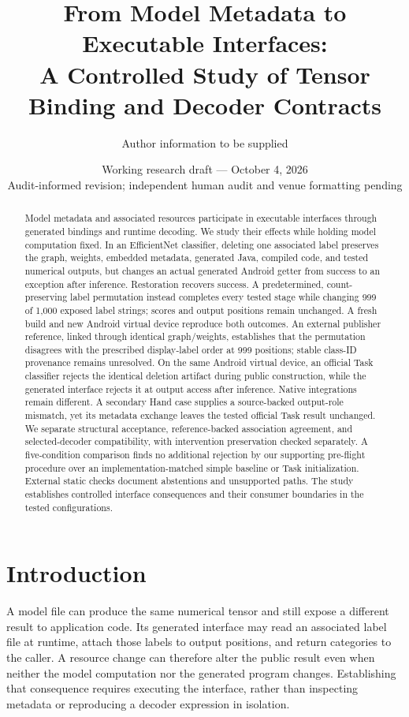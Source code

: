 \documentclass[10pt,twocolumn,letterpaper]{article}
\title{From Model Metadata to Executable Interfaces:\\A Controlled Study of Tensor Binding and Decoder Contracts}
\author{Author information to be supplied}
\date{Working research draft --- October 4, 2026\\\small Audit-informed revision; independent human audit and venue formatting pending}
\begin{document}
\maketitle

\begin{abstract}
Model metadata and associated resources participate in executable interfaces through generated bindings and runtime decoding. We study their effects while holding model computation fixed. In an EfficientNet classifier, deleting one associated label preserves the graph, weights, embedded metadata, generated Java, compiled code, and tested numerical outputs, but changes an actual generated Android getter from success to an exception after inference. Restoration recovers success. A predetermined, count-preserving label permutation instead completes every tested stage while changing 999 of 1,000 exposed label strings; scores and output positions remain unchanged. A fresh build and new Android virtual device reproduce both outcomes. An external publisher reference, linked through identical graph/weights, establishes that the permutation disagrees with the prescribed display-label order at 999 positions; stable class-ID provenance remains unresolved. On the same Android virtual device, an official Task classifier rejects the identical deletion artifact during public construction, while the generated interface rejects it at output access after inference. Native integrations remain different. A secondary Hand case supplies a source-backed output-role mismatch, yet its metadata exchange leaves the tested official Task result unchanged. We separate structural acceptance, reference-backed association agreement, and selected-decoder compatibility, with intervention preservation checked separately. A five-condition comparison finds no additional rejection by our supporting pre-flight procedure over an implementation-matched simple baseline or Task initialization. External static checks document abstentions and unsupported paths. The study establishes controlled interface consequences and their consumer boundaries in the tested configurations.
\end{abstract}

\section{Introduction}
A model file can produce the same numerical tensor and still expose a different result to application code. Its generated interface may read an associated label file at runtime, attach those labels to output positions, and return categories to the caller. A resource change can therefore alter the public result even when neither the model computation nor the generated program changes. Establishing that consequence requires executing the interface, rather than inspecting metadata or reproducing a decoder expression in isolation.
\end{document}

